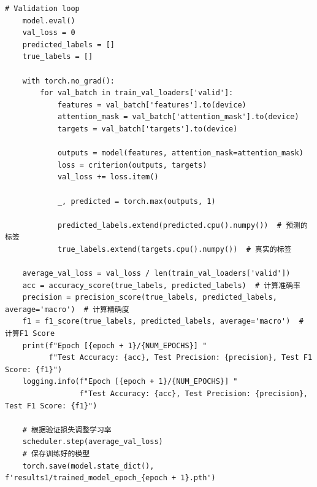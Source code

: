 \documentclass{article}
\begin{document}
\begin{lstlisting}[style=Style]
    # Validation loop
    model.eval()
    val_loss = 0
    predicted_labels = []
    true_labels = []

    with torch.no_grad():
        for val_batch in train_val_loaders['valid']:
            features = val_batch['features'].to(device)
            attention_mask = val_batch['attention_mask'].to(device)
            targets = val_batch['targets'].to(device)

            outputs = model(features, attention_mask=attention_mask)
            loss = criterion(outputs, targets)
            val_loss += loss.item()

            _, predicted = torch.max(outputs, 1)

            predicted_labels.extend(predicted.cpu().numpy())  # 预测的标签
            true_labels.extend(targets.cpu().numpy())  # 真实的标签

    average_val_loss = val_loss / len(train_val_loaders['valid'])
    acc = accuracy_score(true_labels, predicted_labels)  # 计算准确率
    precision = precision_score(true_labels, predicted_labels, average='macro')  # 计算精确度
    f1 = f1_score(true_labels, predicted_labels, average='macro')  # 计算F1 Score
    print(f"Epoch [{epoch + 1}/{NUM_EPOCHS}] "
          f"Test Accuracy: {acc}, Test Precision: {precision}, Test F1 Score: {f1}")
    logging.info(f"Epoch [{epoch + 1}/{NUM_EPOCHS}] "
                 f"Test Accuracy: {acc}, Test Precision: {precision}, Test F1 Score: {f1}")

    # 根据验证损失调整学习率
    scheduler.step(average_val_loss)
    # 保存训练好的模型
    torch.save(model.state_dict(), f'results1/trained_model_epoch_{epoch + 1}.pth')
\end{lstlisting}
\end{document}
